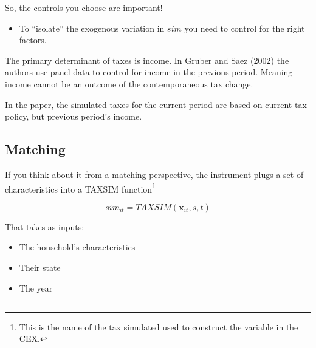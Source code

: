 \documentclass[
  letterpaper,
  DIV=11,
  numbers=noendperiod]{scrartcl}
\providecommand{\tightlist}{%
  \setlength{\itemsep}{0pt}\setlength{\parskip}{0pt}}
\begin{document}
So, the controls you choose are important!

\begin{itemize}
\tightlist
\item
  To ``isolate'' the exogenous variation in \(sim\) you need to control
  for the right factors.
\end{itemize}

\begin{tcolorbox}[enhanced jigsaw, colback=white, colframe=quarto-callout-caution-color-frame, breakable, toptitle=1mm, titlerule=0mm, coltitle=black, rightrule=.15mm, opacitybacktitle=0.6, left=2mm, leftrule=.75mm, title=\textcolor{quarto-callout-caution-color}{\faFire}\hspace{0.5em}{Income}, bottomrule=.15mm, toprule=.15mm, colbacktitle=quarto-callout-caution-color!10!white, bottomtitle=1mm, opacityback=0, arc=.35mm]

The primary determinant of taxes is income. In Gruber and Saez (2002)
the authors use panel data to control for income in the previous period.
Meaning income cannot be an outcome of the contemporaneous tax change.

In the paper, the simulated taxes for the current period are based on
current tax policy, but previous period's income.

\end{tcolorbox}

\subsection{Matching}\label{matching}

If you think about it from a matching perspective, the instrument plugs
a set of characteristics into a TAXSIM function\footnote{This is the
  name of the tax simulated used to construct the variable in the CEX.}

\[
  sim_{it} = TAXSIM(\mathbf{x}_{it},s,t)
\]

That takes as inputs:

\begin{itemize}
\item
  The household's characteristics
\item
  Their state
\item
  The year
\end{itemize}

\subsection{}\label{section-1}
\end{document}

